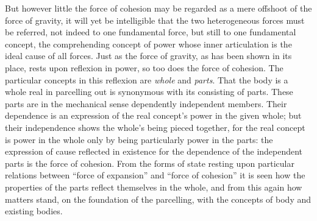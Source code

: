 \documentclass[12pt,a4paper]{book}
\begin{document}
But however little the force of cohesion may be regarded as a mere offshoot of the force of gravity,
it will yet be intelligible that the two heterogeneous forces must be referred, not indeed to one
fundamental force, but still to one fundamental concept, the comprehending concept of power whose
inner articulation is the ideal cause of all forces. Just as the force of gravity, as has been shown
in its place, rests upon reflexion in power, so too does the force of cohesion. The particular
concepts in this reflexion are \emph{whole} and \emph{parts}. That the body is a whole real in
parcelling out is synonymous with its consisting of parts. These parts are in the mechanical sense
dependently independent members. Their dependence is an expression of the real concept's power in
the given whole; but their independence shows the whole's being pieced together, for the real concept
is power in the whole only by being particularly power in the parts: the expression of cause
reflected in existence for the dependence of the independent parts is the force of cohesion. From the
forms of state resting upon particular relations between ``force of expansion'' and ``force of
cohesion'' it is seen how the properties of the parts reflect themselves in the whole, and from this
again how matters stand, on the foundation of the parcelling, with the concepts of body and existing
bodies.
\end{document}
